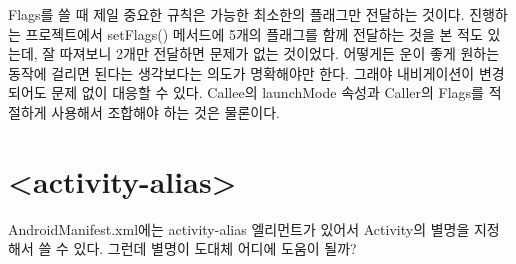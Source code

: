Flags를 쓸 때 제일 중요한 규칙은 가능한 최소한의 플래그만 전달하는 것이다.
진행하는 프로젝트에서 setFlags() 메서드에 5개의 플래그를 함께 전달하는 것을 본 적도 있는데, 잘 따져보니 2개만 전달하면 문제가 없는 것이었다.
어떻게든 운이 좋게 원하는 동작에 걸리면 된다는 생각보다는 의도가 명확해야만 한다. 그래야 내비게이션이 변경되어도 문제 없이 대응할 수 있다. Callee의 launchMode 속성과 Caller의 Flags를 적절하게 사용해서 조합해야 하는 것은 물론이다. 

\section{<activity-alias>}\label{sec:alias}
AndroidManifest.xml에는 activity-alias 엘리먼트가 있어서 Activity의 별명을 지정해서 쓸 수 있다. 그런데 별명이 도대체 어디에 도움이 될까?


